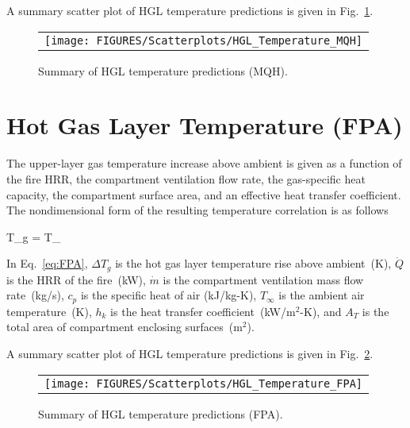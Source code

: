 \clearpage

A summary scatter plot of HGL temperature predictions is given in Fig.~\ref{hgl_temperature_MQH_summary}. 

\begin{figure}[ht]
\begin{center}
\begin{tabular}{l}
\texttt{[image: FIGURES/Scatterplots/HGL\_Temperature\_MQH]}
\end{tabular}
\end{center}
\caption[Summary of HGL temperature predictions (MQH).]
{Summary of HGL temperature predictions (MQH).}
\label{hgl_temperature_MQH_summary}
\end{figure}


\clearpage


\section{Hot Gas Layer Temperature (FPA)}

The upper-layer gas temperature increase above ambient is given as a function of the fire HRR, the compartment ventilation flow rate, the gas-specific heat capacity, the compartment surface area, and an effective heat transfer coefficient. The nondimensional form of the resulting temperature correlation is as follows

\be
\Delta T_g =  T_\infty
\label{eq:FPA}
\ee

In Eq.~\ref{eq:FPA}, $\Delta T_g$ is the hot gas layer temperature rise above ambient~(K), $\dot Q$ is the HRR of the fire~(kW), $\dot m$ is the compartment ventilation mass flow rate~(kg/s), $c_p$ is the specific heat of air (kJ/kg-K), $T_\infty$ is the ambient air temperature~(K), $h_k$ is the heat transfer coefficient~(kW/m$^2$-K), and $A_T$ is the total area of compartment enclosing surfaces~(m$^2$).

\clearpage

A summary scatter plot of HGL temperature predictions is given in Fig.~\ref{hgl_temperature_FPA_summary}. 

\begin{figure}[ht]
\begin{center}
\begin{tabular}{l}
\texttt{[image: FIGURES/Scatterplots/HGL\_Temperature\_FPA]}
\end{tabular}
\end{center}
\caption[Summary of HGL temperature predictions (FPA).]
{Summary of HGL temperature predictions (FPA).}
\label{hgl_temperature_FPA_summary}
\end{figure}


